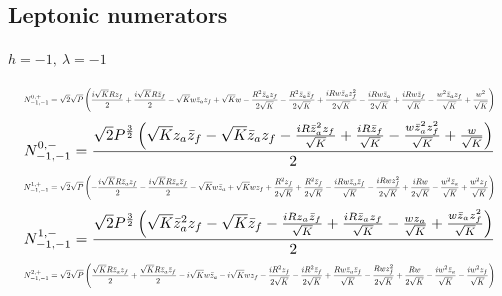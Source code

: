 \documentclass[10pt]{article}
\begin{document}
\subsection*{Leptonic numerators}
\small
\paragraph{$h=-1,\ \lambda=-1$}
\begin{equation*}
\resizebox{0.98\textwidth}{!}{${\displaystyle N^{0,+}_{-1,-1}=\sqrt{2} \sqrt{P} \left(\frac{i \sqrt{K} R z_f}{2} + \frac{i \sqrt{K} R \bar z_f}{2} - \sqrt{K} w \bar z_a z_f + \sqrt{K} w - \frac{R^{2} \bar z_a z_f}{2 \sqrt{K}} - \frac{R^{2} \bar z_a \bar z_f}{2 \sqrt{K}} + \frac{i R w \bar z_a z_f^{2}}{2 \sqrt{K}} - \frac{i R w \bar z_a}{2 \sqrt{K}} + \frac{i R w \bar z_f}{\sqrt{K}} - \frac{w^{2} \bar z_a z_f}{\sqrt{K}} + \frac{w^{2}}{\sqrt{K}}\right)}$}
\end{equation*}
\begin{equation*}
\resizebox{0.98\textwidth}{!}{${\displaystyle N^{0,-}_{-1,-1}=\frac{\sqrt{2} P^{\frac{3}{2}} \left(\sqrt{K} z_a \bar z_f - \sqrt{K} \bar z_a z_f - \frac{i R \bar z_a^{2} z_f}{\sqrt{K}} + \frac{i R \bar z_f}{\sqrt{K}} - \frac{w \bar z_a^{2} z_f^{2}}{\sqrt{K}} + \frac{w}{\sqrt{K}}\right)}{2}}$}
\end{equation*}
\begin{equation*}
\resizebox{0.98\textwidth}{!}{${\displaystyle N^{1,+}_{-1,-1}=\sqrt{2} \sqrt{P} \left(- \frac{i \sqrt{K} R \bar z_a z_f}{2} - \frac{i \sqrt{K} R \bar z_a \bar z_f}{2} - \sqrt{K} w \bar z_a + \sqrt{K} w z_f + \frac{R^{2} z_f}{2 \sqrt{K}} + \frac{R^{2} \bar z_f}{2 \sqrt{K}} - \frac{i R w \bar z_a \bar z_f}{\sqrt{K}} - \frac{i R w z_f^{2}}{2 \sqrt{K}} + \frac{i R w}{2 \sqrt{K}} - \frac{w^{2} \bar z_a}{\sqrt{K}} + \frac{w^{2} z_f}{\sqrt{K}}\right)}$}
\end{equation*}
\begin{equation*}
\resizebox{0.98\textwidth}{!}{${\displaystyle N^{1,-}_{-1,-1}=\frac{\sqrt{2} P^{\frac{3}{2}} \left(\sqrt{K} \bar z_a^{2} z_f - \sqrt{K} \bar z_f - \frac{i R z_a \bar z_f}{\sqrt{K}} + \frac{i R \bar z_a z_f}{\sqrt{K}} - \frac{w z_a}{\sqrt{K}} + \frac{w \bar z_a z_f^{2}}{\sqrt{K}}\right)}{2}}$}
\end{equation*}
\begin{equation*}
\resizebox{0.98\textwidth}{!}{${\displaystyle N^{2,+}_{-1,-1}=\sqrt{2} \sqrt{P} \left(\frac{\sqrt{K} R \bar z_a z_f}{2} + \frac{\sqrt{K} R \bar z_a \bar z_f}{2} - i \sqrt{K} w \bar z_a - i \sqrt{K} w z_f - \frac{i R^{2} z_f}{2 \sqrt{K}} - \frac{i R^{2} \bar z_f}{2 \sqrt{K}} + \frac{R w \bar z_a \bar z_f}{\sqrt{K}} - \frac{R w z_f^{2}}{2 \sqrt{K}} + \frac{R w}{2 \sqrt{K}} - \frac{i w^{2} \bar z_a}{\sqrt{K}} - \frac{i w^{2} z_f}{\sqrt{K}}\right)}$}
\end{equation*}
\end{document}
